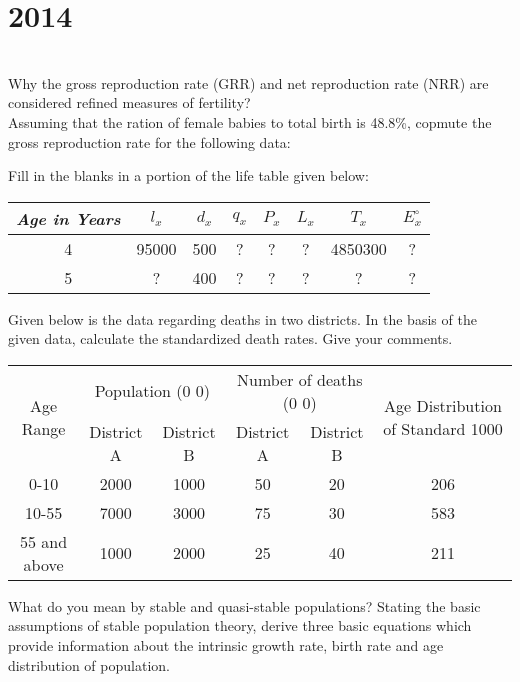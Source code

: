 \section*{2014}
\vspace{-.5cm}
\hrulefill \smallskip\\
 Why the gross reproduction rate (GRR) and net reproduction rate (NRR) are considered refined measures of fertility?\\
Assuming that the ration of female babies to total birth is 48.8\%, copmute the gross reproduction rate for the following data:
\begin{center}
\end{center}
 Fill in the blanks in a portion of the life table given below:
\begin{center}
    \begin{tabular}{| c | *{6}{c|} c|}
    \hline
    \emph{Age in Years} & $l_x$ & $d_x$ & $q_x$ & $P_x$ & $L_x$ & $T_x$ & $E_x^\circ$ \\ \hline
    4  & 95000 & 500 & ? & ? & ? & 4850300 & ?\\ \hline 
    5 & ?     & 400 & ? & ? & ? & ? & ?\\ 
    \hline
    \end{tabular}
\end{center}
 Given below is the data regarding deaths in two districts. In the basis of the given data, calculate the standardized death rates. Give your comments.
\begin{center}
    \begin{tabular}{| c | *{4}{c|} c|}
    \hline
    \multirow{2}{*}{ Age Range}&\multicolumn{2}{c|}{Population (0 0)}&\multicolumn{2}{c|}{Number of deaths (0 0)} & \multirow{2}{3cm}{Age Distribution of Standard 1000} \\ \cline{2-5}
    & District A & District B & District A & District B & \\ \hline
    0-10 & 2000 & 1000 & 50 & 20 & 206 \\ \hline
    10-55 &7000 & 3000 & 75 & 30 & 583 \\ \hline
    55 and above& 1000 & 2000 & 25 & 40 & 211 \\ 
    \hline
    \end{tabular}
\end{center}
 What do you mean by stable and quasi-stable populations? Stating the basic assumptions of stable population theory, derive three basic equations which provide information about the intrinsic growth rate, birth rate and age distribution of population.
